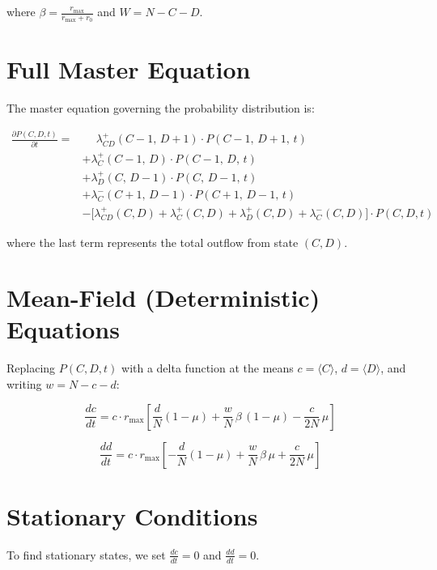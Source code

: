 \documentclass[11pt,a4paper]{article}
\begin{document}
where $\beta = \frac{r_{\max}}{r_{\max} + r_0}$ and $W = N - C - D$.

\section{Full Master Equation}

The master equation governing the probability distribution is:

\begin{align*}
\frac{\partial P(C,D,t)}{\partial t} = 
&\phantom{+} \lambda^+_{CD}(C-1,\, D+1)\cdot P(C-1,\, D+1,\, t) \tag{dead site $\to$ live cancer daughter} \\
&+ \lambda^+_{C}(C-1,\, D)\cdot P(C-1,\, D,\, t) \tag{WT site $\to$ live cancer daughter} \\
&+ \lambda^+_{D}(C,\, D-1)\cdot P(C,\, D-1,\, t) \tag{WT site $\to$ dead daughter} \\
&+ \lambda^-_{C}(C+1,\, D-1)\cdot P(C+1,\, D-1,\, t) \tag{cancer site $\to$ dead daughter} \\
&- \Big[\lambda^+_{CD}(C,D) + \lambda^+_{C}(C,D) + \lambda^+_{D}(C,D) + \lambda^-_{C}(C,D)\Big]\cdot P(C,D,t)
\end{align*}

where the last term represents the total outflow from state $(C, D)$.

\section{Mean-Field (Deterministic) Equations}

Replacing $P(C,D,t)$ with a delta function at the means $c = \langle C \rangle$, $d = \langle D \rangle$, and writing $w = N - c - d$:

\begin{equation}
\frac{dc}{dt} = c \cdot r_{\max} \left[ \frac{d}{N}(1-\mu) + \frac{w}{N}\,\beta\,(1-\mu) - \frac{c}{2N}\,\mu \right]
\end{equation}

\begin{equation}
\frac{dd}{dt} = c \cdot r_{\max} \left[ -\frac{d}{N}(1-\mu) + \frac{w}{N}\,\beta\,\mu + \frac{c}{2N}\,\mu \right]
\end{equation}

\section{Stationary Conditions}

To find stationary states, we set $\frac{dc}{dt} = 0$ and $\frac{dd}{dt} = 0$.
\end{document}
